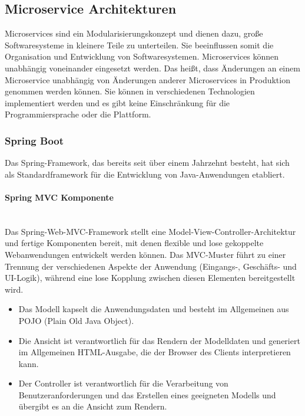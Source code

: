 \subsection{Microservice Architekturen}

Microservices sind ein Modularisierungskonzept und dienen dazu, große Softwaresysteme in kleinere Teile zu unterteilen. Sie beeinflussen somit die Organisation und Entwicklung von Softwaresystemen. Microservices können unabhängig voneinander eingesetzt werden. Das heißt, dass Änderungen an einem Microservice unabhängig von Änderungen anderer Microservices in Produktion genommen werden können. Sie können in verschiedenen Technologien implementiert werden und es gibt keine Einschränkung für die Programmiersprache oder die Plattform\cite[45--46]{wolff2016microservices}.

\subsubsection{Spring Boot}

Das Spring-Framework, das bereits seit über einem Jahrzehnt besteht, hat sich als Standardframework für die Entwicklung von Java-Anwendungen etabliert.

\paragraph{Spring MVC Komponente}\mbox{}\\

Das Spring-Web-MVC-Framework stellt eine Model-View-Controller-Architektur und fertige Komponenten bereit, mit denen flexible und lose gekoppelte Webanwendungen entwickelt werden können. Das MVC-Muster führt zu einer Trennung der verschiedenen Aspekte der Anwendung (Eingangs-, Geschäfts- und UI-Logik), während eine lose Kopplung zwischen diesen Elementen bereitgestellt wird\cite{tp12mvc}.

\begin{itemize}
	\item Das Modell kapselt die Anwendungsdaten und besteht im Allgemeinen aus POJO (Plain Old Java Object).
	\item Die Ansicht ist verantwortlich für das Rendern der Modelldaten und generiert im Allgemeinen HTML-Ausgabe, die der Browser des Clients interpretieren kann.
	\item Der Controller ist verantwortlich für die Verarbeitung von Benutzeranforderungen und das Erstellen eines geeigneten Modells und übergibt es an die Ansicht zum Rendern.
\end{itemize}

